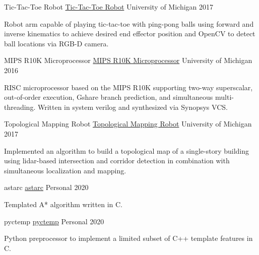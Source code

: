 \documentclass[11pt, a4paper]{cv}
\newenvironment{projects}{}{\par}
\newenvironment{cv}{}{\par}
\begin{document}
\begin{cv}
\begin{projects}
\begin{cventries}
{
{Tic-Tac-Toe Robot}
{\color{hrefblue}\href{https://drive.google.com/drive/folders/102AN8otUolVnhyJ00cVi4qK0T-imfvds}{Tic-Tac-Toe Robot}}}
{}
{University of Michigan}
{2017}
{\begin{cvparagraph}
Robot arm capable of playing tic-tac-toe with ping-pong balls using forward and inverse kinematics to achieve desired end effector position and OpenCV to detect ball locations via RGB-D camera.
\end{cvparagraph}}
\cventrycompact
{
{MIPS R10K Microprocessor}
{\color{hrefblue}\href{https://drive.google.com/drive/folders/1Zar\_EmEbRwZw6HVLnNumsjWDx8cLE\_pI}{MIPS R10K Microprocessor}}}
{}
{University of Michigan}
{2016}
{\begin{cvparagraph}
RISC microprocessor based on the MIPS R10K supporting two-way superscalar, out-of-order execution, Gshare branch prediction, and simultaneous multi-threading. Written in system verilog and synthesized via Synopsys VCS.
\end{cvparagraph}}
\cventrycompact
{
{Topological Mapping Robot}
{\color{hrefblue}\href{https://drive.google.com/drive/folders/1HPq7hU05i7k-j3WwfQ18W5DzQ3FlkSZ9}{Topological Mapping Robot}}}
{}
{University of Michigan}
{2017}
{\begin{cvparagraph}
Implemented an algorithm to build a topological map of a single-story building using lidar-based intersection and corridor detection in combination with simultaneous localization and mapping.
\end{cvparagraph}}
\cventrycompact
{
{astarc}
{\color{hrefblue}\href{https://github.com/brandonmosher/astarc}{astarc}}}
{}
{Personal}
{2020}
{\begin{cvparagraph}
Templated A* algorithm written in C.
\end{cvparagraph}}
\cventrycompact
{
{pyctemp}
{\color{hrefblue}\href{https://github.com/brandonmosher/pyctemp}{pyctemp}}}
{}
{Personal}
{2020}
{\begin{cvparagraph}
Python preprocessor to implement a limited subset of C++ template features in C.
\end{cvparagraph}}
\cventrycompact
{
}
\end{cventries}
\end{projects}
\end{cv}
\end{document}
